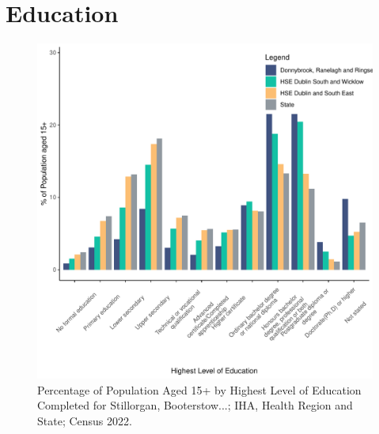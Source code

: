 \documentclass{article}
\begin{document}
\section{Education}\label{sect:Edu}
\begin{figure}[H]
	\centering
	\includegraphics[width = 120mm]{../figures/EduED.pdf}
	\caption{Percentage of Population Aged 15+ by Highest Level of Education Completed for Stillorgan, Booterstow...; IHA, Health Region and State; Census 2022.}
	\label{fig:vbnv}
	\end{figure}
\end{document}
